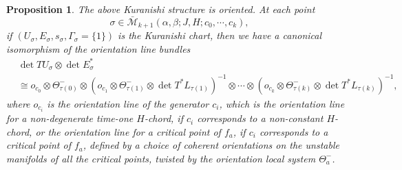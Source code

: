\documentclass{amsart}
\newtheorem{proposition}[theorem]{Proposition}
\numberwithin{equation}{section}
\numberwithin{figure}{section}
\begin{document}
\begin{proposition}
	The above Kuranishi structure is oriented. At each point 
\begin{equation*}
\sigma \in \bar{\mathcal{M}}_{k+1}(\alpha, \beta; J, H; c_{0}, \cdots, c_{k}),
\end{equation*}
if $(U_{\sigma}, E_{\sigma}, s_{\sigma}, \Gamma_{\sigma} = \{1\})$ is the Kuranishi chart, then we have a canonical isomorphism of the orientation line bundles
\begin{equation}\label{orientation on the moduli space of pearly tree maps in the case of clean self-intersection}
\begin{split}
&\det TU_{\sigma} \otimes \det E_{\sigma}^{*}\\ 
&\cong
o_{c_{0}} \otimes \Theta_{\tau(0)}^{-} \otimes (o_{c_{1}} \otimes \Theta_{\tau(1)}^{-} \otimes \det T^{*}L_{\tau(1)})^{-1} \otimes \cdots \otimes (o_{c_{k}} \otimes \Theta_{\tau(k)}^{-} \otimes \det T^{*}L_{\tau(k)})^{-1},
\end{split}
\end{equation}
where $o_{c_{i}}$ is the orientation line of the generator $c_{i}$, which is the orientation line for a non-degenerate time-one $H$-chord, if $c_{i}$ corresponds to a non-constant $H$-chord, or the orientation line for a critical point of $f_{a}$, if $c_{i}$ corresponds to a critical point of $f_{a}$, defined by a choice of coherent orientations on the unstable manifolds of all the critical points, twisted by the orientation local system $\Theta_{a}^{-}$.
\end{proposition}
\end{document}
